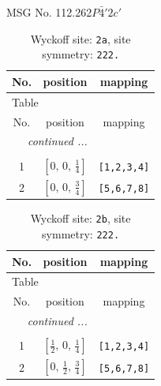 \documentclass[fleqn,8pt]{jsarticle}
\begin{document}
\setcounter{MaxMatrixCols}{32}

\renewcommand{\tablename}{Table~}
\renewcommand{\figurename}{Figure~}
\begin{center}
\LARGE
MSG No. 112.262\quad$P\bar{4}'2c'$
\end{center}
\renewcommand{\arraystretch}{1.2}
\begin{longtable}{ccc}
\caption{Wyckoff site: {\tt 2a}, site symmetry: {\tt 222.}}
 \\
 \hline \hline
No. & position & mapping \\ \hline \endfirsthead

\multicolumn{2}{l}{\tablename\ \thetable{}} \\
 \hline \hline
No. & position & mapping \\ \hline \endhead

 \hline \hline
\multicolumn{2}{r}{\footnotesize\it continued ...} \\ \endfoot

 \hline \hline
\multicolumn{2}{r}{} \\ \endlastfoot

1 & $\left[ 0,\, 0,\, \frac{1}{4} \right]$ & {\tt [1,2,3,4]} \\ \hline
2 & $\left[ 0,\, 0,\, \frac{3}{4} \right]$ & {\tt [5,6,7,8]} \\
\end{longtable}
\renewcommand{\arraystretch}{1.2}
\begin{longtable}{ccc}
\caption{Wyckoff site: {\tt 2b}, site symmetry: {\tt 222.}}
 \\
 \hline \hline
No. & position & mapping \\ \hline \endfirsthead

\multicolumn{2}{l}{\tablename\ \thetable{}} \\
 \hline \hline
No. & position & mapping \\ \hline \endhead

 \hline \hline
\multicolumn{2}{r}{\footnotesize\it continued ...} \\ \endfoot

 \hline \hline
\multicolumn{2}{r}{} \\ \endlastfoot

1 & $\left[ \frac{1}{2},\, 0,\, \frac{1}{4} \right]$ & {\tt [1,2,3,4]} \\ \hline
2 & $\left[ 0,\, \frac{1}{2},\, \frac{3}{4} \right]$ & {\tt [5,6,7,8]} \\
\end{longtable}
\end{document}
